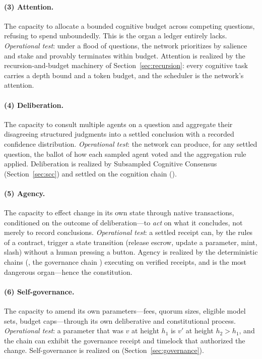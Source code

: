 \paragraph{(3) Attention.} The capacity to allocate a bounded cognitive budget across competing questions, refusing to spend unboundedly. This is the organ a ledger entirely lacks. \emph{Operational test}: under a flood of questions, the network prioritizes by salience and stake and provably terminates within budget. Attention is realized by the recursion-and-budget machinery of Section~\ref{sec:recursion}: every cognitive task carries a depth bound and a token budget, and the scheduler is the network's attention.

\paragraph{(4) Deliberation.} The capacity to consult multiple agents on a question and aggregate their disagreeing structured judgments into a settled conclusion with a recorded confidence distribution. \emph{Operational test}: the network can produce, for any settled question, the ballot of how each sampled agent voted and the aggregation rule applied. Deliberation is realized by Subsampled Cognitive Consensus (Section~\ref{sec:scc}) and settled on the cognition chain (\AChain{}).

\paragraph{(5) Agency.} The capacity to effect change in its own state through native transactions, conditioned on the outcome of deliberation---to \emph{act} on what it concludes, not merely to record conclusions. \emph{Operational test}: a settled \PoT{} receipt can, by the rules of a contract, trigger a state transition (release escrow, update a parameter, mint, slash) without a human pressing a button. Agency is realized by the deterministic chains (\CChain{}, the governance chain \GChain{}) executing on verified receipts, and is the most dangerous organ---hence the constitution.

\paragraph{(6) Self-governance.} The capacity to amend its own parameters---fees, quorum sizes, eligible model sets, budget caps---through its own deliberative and constitutional process. \emph{Operational test}: a parameter that was $v$ at height $h_1$ is $v'$ at height $h_2 > h_1$, and the chain can exhibit the governance receipt and timelock that authorized the change. Self-governance is realized on \GChain{} (Section~\ref{sec:governance}).

